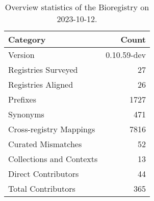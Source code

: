 \begin{table}
\caption{Overview statistics of the Bioregistry on 2023-10-12.}
\label{tab:bioregistry-summary}
\begin{tabular}{lr}
\toprule
Category & Count \\
\midrule
Version & 0.10.59-dev \\
Registries Surveyed & 27 \\
Registries Aligned & 26 \\
Prefixes & 1727 \\
Synonyms & 471 \\
Cross-registry Mappings & 7816 \\
Curated Mismatches & 52 \\
Collections and Contexts & 13 \\
Direct Contributors & 44 \\
Total Contributors & 365 \\
\bottomrule
\end{tabular}
\end{table}
